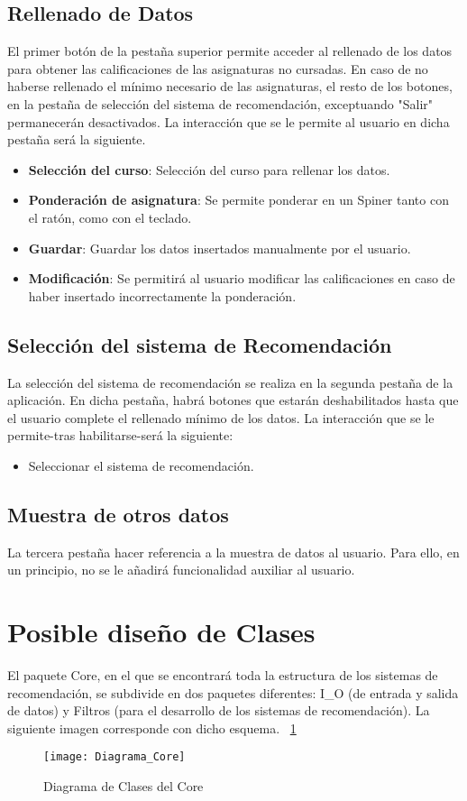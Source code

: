 \subsection{Rellenado de Datos}
El primer botón de la pestaña superior permite acceder al rellenado de los datos para obtener las calificaciones de las asignaturas no cursadas. En caso de no haberse rellenado el mínimo necesario de las asignaturas, el resto de los botones, en la pestaña de selección del sistema de recomendación, exceptuando "Salir" permanecerán desactivados. 
La interacción que se le permite al usuario en dicha pestaña será la siguiente. 
\begin{itemize}
\item \textbf{Selección del curso}: Selección del curso para rellenar los datos. 
\item \textbf{Ponderación de asignatura}: Se permite ponderar en un Spiner tanto con el ratón, como con el teclado.
\item \textbf{Guardar}: Guardar los datos insertados  manualmente  por el usuario. 
\item \textbf{Modificación}: Se permitirá al usuario modificar las calificaciones en caso de haber insertado incorrectamente la ponderación. 

\end{itemize}

\subsection{Selección del sistema de Recomendación}
La selección del sistema de recomendación se realiza en la segunda pestaña de la aplicación. En dicha pestaña, habrá botones que  estarán deshabilitados hasta que el usuario complete el rellenado mínimo de los datos. 
La interacción que se le permite-tras habilitarse-será la siguiente: 
\begin{itemize}
\item Seleccionar el sistema de recomendación. 
\end{itemize}

\subsection{Muestra de otros datos}
La tercera pestaña hacer referencia  a la muestra de datos al usuario. Para ello, en un principio, no se le añadirá funcionalidad auxiliar al usuario.


\section{Posible diseño de Clases} 
El paquete Core,  en el que se encontrará toda la estructura de los sistemas de recomendación, se subdivide en dos paquetes diferentes: I\_O (de entrada y salida de datos) y Filtros (para el desarrollo de los sistemas de recomendación). La siguiente imagen corresponde con dicho esquema. 
 ~\ref{fig:C.3.5}
\begin{figure}[h]
\centering
\texttt{[image: Diagrama\_Core]}
\caption{Diagrama de Clases del Core}
\label{fig:C.3.5}
\end{figure}